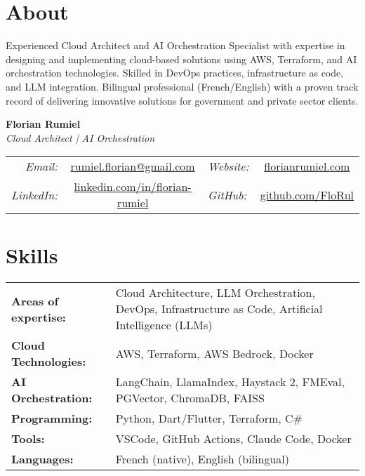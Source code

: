 ﻿\documentclass[11pt,letterpaper]{article}
\begin{document}
\section*{About}
Experienced Cloud Architect and AI Orchestration Specialist with expertise in designing and implementing cloud-based solutions using AWS, Terraform, and AI orchestration technologies.
Skilled in DevOps practices, infrastructure as code, and LLM integration. Bilingual professional (French/English) with a proven track record of delivering innovative solutions for government and private sector clients.
\begin{center}
  {\LARGE\textbf{Florian Rumiel}} \\[0.3em]
  {\large\textit{Cloud Architect | AI Orchestration}} \\[0.5em]
  \begin{tabular}{r c l c}
    \textit{Email:} & \href{mailto:rumiel.florian@gmail.com}{rumiel.florian@gmail.com} & \textit{Website:} & \href{https://florian-rumiel.com}{florianrumiel.com} \\
    \textit{LinkedIn:} & \href{https://linkedin.com/in/florian-rumiel}{linkedin.com/in/florian-rumiel} & \textit{GitHub:} & \href{https://github.com/FloRul}{github.com/FloRul} \\
  \end{tabular}
\end{center}

\section*{Skills}
\begin{tabularx}{\textwidth}{@{}l X@{}}
\textbf{Areas of expertise:} & Cloud Architecture, LLM Orchestration, DevOps, Infrastructure as Code, Artificial Intelligence (LLMs) \\[0.2em]
\textbf{Cloud Technologies:} & AWS, Terraform, AWS Bedrock, Docker \\[0.2em]
\textbf{AI Orchestration:} & LangChain, LlamaIndex, Haystack 2, FMEval, PGVector, ChromaDB, FAISS \\[0.2em]
\textbf{Programming:} & Python, Dart/Flutter, Terraform, C\# \\[0.2em]
\textbf{Tools:} & VSCode, GitHub Actions, Claude Code, Docker \\[0.2em]
\textbf{Languages:} & French (native), English (bilingual) \\
\end{tabularx}
\end{document}
